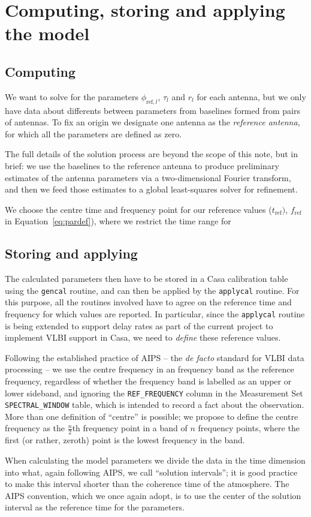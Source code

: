 \documentclass[11pt, twoside, a4paper]{article}
\begin{document}
\section{Computing, storing and applying the model}
\subsection{Computing}

We want to solve for the parameters $\phi_{\mathrm{ref}, l}$,
$\tau_l$
and $r_l$
for each antenna, but we only have data about differents between
parameters from baselines formed from pairs of antennas.  To fix an origin
we designate one antenna as the \emph{reference antenna}, for which all
the parameters are defined as zero.

The full details of the solution process are beyond the scope of this
note, but in brief: we use the baselines to the reference antenna to
produce preliminary estimates of the antenna parameters via a
two-dimensional Fourier transform, and then we feed those estimates to
a global least-squares solver for refinement. 

We choose the centre time and frequency point for our reference values
($t_{\mathrm{ref}})$, $f_{\mathrm{ref}}$ in Equation~\ref{eq:pardef}),
where we restrict the time range for 

\subsection{Storing and applying}
The calculated parameters then have to be stored in a Casa calibration
table using the \texttt{gencal} routine, and can then be applied by the
\texttt{applycal} routine. For this purpose, all the routines involved
have to agree on the reference time and frequency for which values are
reported. In particular, since the \texttt{applycal} routine is being
extended to support delay rates as part of the current project to
implement VLBI support in Casa, we need to \emph{define} these
reference values.

Following the established practice of AIPS -- the \emph{de facto}
standard for VLBI data processing -- we use the centre frequency in an
frequency band as the reference frequency, regardless of whether the
frequency band is labelled as an upper or lower sideband, and ignoring
the \texttt{REF\_FREQUENCY} column in the Measurement Set
\texttt{SPECTRAL\_WINDOW} table, which is intended to record a fact
about the observation. More than one definition of ``centre'' is
possible; we propose to define the centre frequency as the
$\frac{n}{2}$th
frequency point in a band of $n$
frequency points, where the first (or rather, zeroth) point is the
lowest frequency in the band.

When calculating the model parameters we divide the data in the time
dimension into what, again following AIPS, we call ``solution
intervals''; it is good practice to make this interval shorter
than the coherence time of the atmosphere. The AIPS convention, which
we once again adopt, is to use the center of the solution interval as
the reference time for the parameters.
\end{document}

